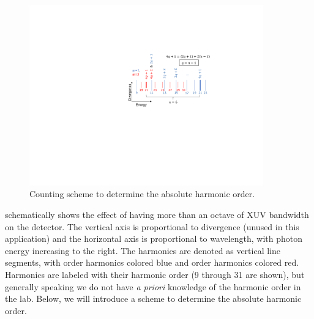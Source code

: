 \begin{figure}
	\centering
	\includegraphics[width=0.9\textwidth]{figures/chap2/harmonic_counting.pdf}
	\caption{Counting scheme to determine the absolute harmonic order.}
	\label{fig:harmonic_counting}
\end{figure}

 schematically shows the effect of having more than an octave of XUV bandwidth on the detector. The vertical axis is proportional to divergence (unused in this application) and the horizontal axis is proportional to wavelength, with photon energy increasing to the right. The harmonics are denoted as vertical line segments, with  order harmonics colored blue and  order harmonics colored red. Harmonics are labeled with their harmonic order (9 through 31 are shown), but generally speaking we do not have \textit{a priori} knowledge of the harmonic order in the lab. Below, we will introduce a scheme to determine the absolute harmonic order.

